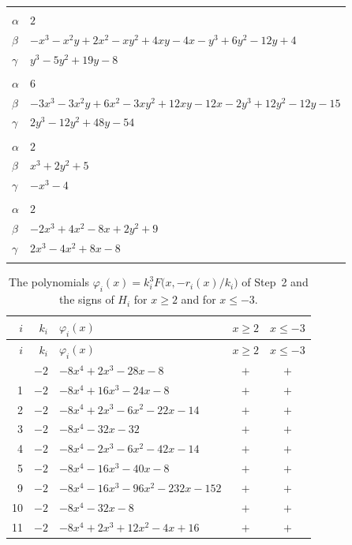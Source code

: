 \documentclass[11pt]{article}
\begin{document}
\begin{longtable}{@{}ll@{}}
\addlinespace[3pt]
\multicolumn{2}{@{}l}{$\{i,j\}=\{9,3\}$, $k_{ij}=2$}\\
$\alpha$ & $2$\\
$\beta$ & $-x^{3}-x^{2}y+2x^{2}-xy^{2}+4xy-4x-y^{3}+6y^{2}-12y+4$\\
$\gamma$ & $y^{3}-5y^{2}+19y-8$\\
\addlinespace[3pt]
\multicolumn{2}{@{}l}{$\{i,j\}=\{9,11\}$, $k_{ij}=2\cdot 3^{3}$}\\
$\alpha$ & $6$\\
$\beta$ & $-3x^{3}-3x^{2}y+6x^{2}-3xy^{2}+12xy-12x-2y^{3}+12y^{2}-12y-15$\\
$\gamma$ & $2y^{3}-12y^{2}+48y-54$\\
\addlinespace[3pt]
\multicolumn{2}{@{}l}{$\{i,j\}=\{10,5\}$, $k_{ij}=2$}\\
$\alpha$ & $2$\\
$\beta$ & $x^{3}+2y^{2}+5$\\
$\gamma$ & $-x^{3}-4$\\
\addlinespace[3pt]
\multicolumn{2}{@{}l}{$\{i,j\}=\{10,11\}$, $k_{ij}=2\cdot 3^{2}$}\\
$\alpha$ & $2$\\
$\beta$ & $-2x^{3}+4x^{2}-8x+2y^{2}+9$\\
$\gamma$ & $2x^{3}-4x^{2}+8x-8$\\
\addlinespace[3pt]
\end{longtable}
\endgroup

\begingroup\footnotesize
\setlength{\LTcapwidth}{\textwidth}
\begin{longtable}{@{}rrlcc@{}}
\caption{The polynomials $\varphi_i(x)=k_i^3F\bigl(x,-r_i(x)/k_i\bigr)$ of Step~2 and the signs of $H_i$ for $x\geq2$ and for $x\leq-3$.}\label{tab:phi}\\
\hline $i$ & $k_i$ & $\varphi_i(x)$ & $x\geq2$ & $x\leq-3$\\\hline\endfirsthead\hline $i$ & $k_i$ & $\varphi_i(x)$ & $x\geq2$ & $x\leq-3$\\\hline\endhead\hline\endfoot
0 & $-2$ & $-8x^{4}+2x^{3}-28x-8$ & $+$ & $+$\\
1 & $-2$ & $-8x^{4}+16x^{3}-24x-8$ & $+$ & $+$\\
2 & $-2$ & $-8x^{4}+2x^{3}-6x^{2}-22x-14$ & $+$ & $+$\\
3 & $-2$ & $-8x^{4}-32x-32$ & $+$ & $+$\\
4 & $-2$ & $-8x^{4}-2x^{3}-6x^{2}-42x-14$ & $+$ & $+$\\
5 & $-2$ & $-8x^{4}-16x^{3}-40x-8$ & $+$ & $+$\\
9 & $-2$ & $-8x^{4}-16x^{3}-96x^{2}-232x-152$ & $+$ & $+$\\
10 & $-2$ & $-8x^{4}-32x-8$ & $+$ & $+$\\
11 & $-2$ & $-8x^{4}+2x^{3}+12x^{2}-4x+16$ & $+$ & $+$\\
\end{longtable}
\endgroup
\end{document}
